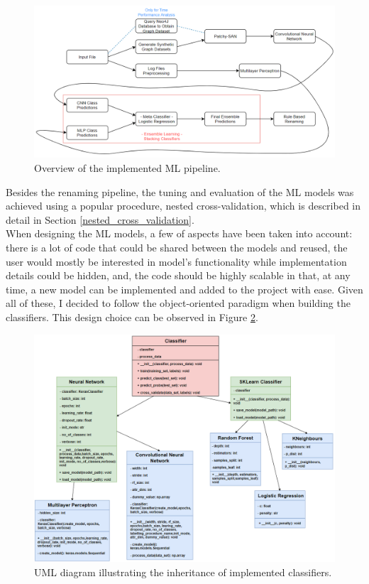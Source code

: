 \begin{figure}[H]
  \centering
  \centerline{\includegraphics[scale = 0.6]{Images/pipeline.png}}
  \caption{Overview of the implemented ML pipeline.}
  \label{pipeline}
\end{figure}

Besides the renaming pipeline, the tuning and evaluation of the ML models was achieved using a popular procedure, nested cross-validation, which is described in detail in Section \ref{nested_cross_validation}. \\

When designing the ML models, a few of aspects have been taken into account: there is a lot of code that could be shared between the models and reused, the user would mostly be interested in model's functionality while implementation details could be hidden, and, the code should be highly scalable in that, at any time, a new model can be implemented and added to the project with ease. Given all of these, I decided to follow the object-oriented paradigm when building the classifiers. This design choice can be observed in Figure \ref{uml_oop}.

\begin{figure}[H]
  \centering
  \centerline{\includegraphics[scale = 0.6]{Images/uml.png}}
  \caption{UML diagram illustrating the inheritance of implemented classifiers.}
  \label{uml_oop}
\end{figure}

